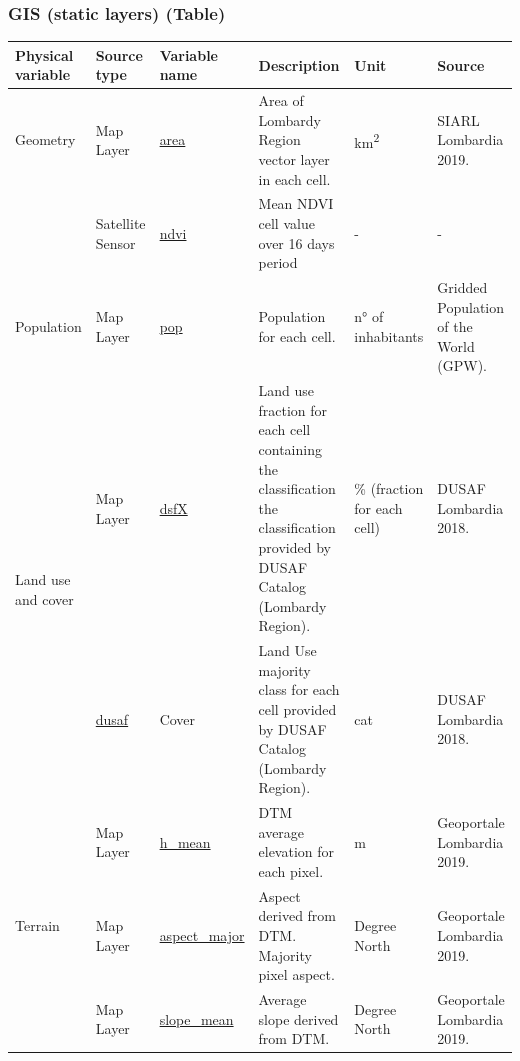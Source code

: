 \subsubsection{GIS (static layers) (Table)}

\begin{center}
\setlength{\arrayrulewidth}{1.5pt}
\begin{longtable}{ |p{2.1cm}|p{1.5cm}|p{2.3cm}|p{4cm}|p{1.5cm}|p{2cm}| } 
\hline
\textbf{Physical variable} & \textbf{Source type}  & \textbf{Variable name}  & \textbf{Description}  & \textbf{Unit}  & \textbf{Source}\\ 
\hline
\multirow{1}{4em}{Geometry} & Map Layer  & \underline{area} & Area of Lombardy Region vector layer in each cell. & km\textsuperscript{2} & SIARL Lombardia 2019.\\ 
& Satellite \newline Sensor  & \underline{ndvi} &  Mean NDVI cell value over 16 days period & - & - \\ \hline

\multirow{1}{4em}{Population} & Map Layer  & \underline{pop} & Population for each cell. & n° of inhabitants& Gridded Population of the World (GPW).\\ \hline

\multirow{2}{4em}{Land use and cover} & Map Layer  & \underline{dsfX} & Land use fraction for each cell containing the classification the classification provided by DUSAF Catalog (Lombardy Region). & \% (fraction for each cell) & DUSAF Lombardia 2018.\\ 
Map Layer  & \underline{dusaf} & Cover & Land Use majority class for each cell provided by DUSAF Catalog (Lombardy Region). & cat  & DUSAF Lombardia 2018.\\
\hline

\multirow{3}{4em}{Terrain} & Map Layer  & \underline{h\_mean} & DTM average elevation for each pixel. & m & Geoportale Lombardia 2019.\\ 
& Map Layer  & \underline{aspect\_major} & Aspect derived from DTM. Majority pixel aspect. & Degree North & Geoportale Lombardia 2019.\\ 
& Map Layer  & \underline{slope\_mean} & Average slope derived from DTM. & Degree North & Geoportale Lombardia 2019.\\ 


\end{longtable}
\end{center}
